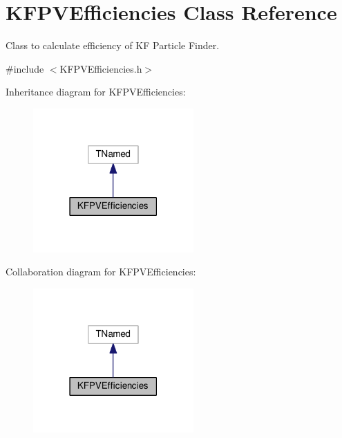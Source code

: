 \hypertarget{classKFPVEfficiencies}{}\section{K\+F\+P\+V\+Efficiencies Class Reference}
\label{classKFPVEfficiencies}


Class to calculate efficiency of KF Particle Finder.  




{\ttfamily \#include $<$K\+F\+P\+V\+Efficiencies.\+h$>$}



Inheritance diagram for K\+F\+P\+V\+Efficiencies\+:
\nopagebreak
\begin{figure}[H]
\begin{center}
\leavevmode
\includegraphics[width=174pt]{classKFPVEfficiencies__inherit__graph}
\end{center}
\end{figure}


Collaboration diagram for K\+F\+P\+V\+Efficiencies\+:
\nopagebreak
\begin{figure}[H]
\begin{center}
\leavevmode
\includegraphics[width=174pt]{classKFPVEfficiencies__coll__graph}
\end{center}
\end{figure}

